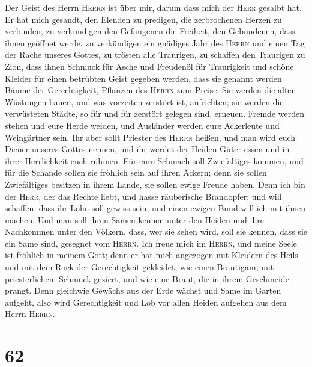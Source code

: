  Der Geist des Herrn \textsc{Herrn} ist über mir, darum
dass mich der \textsc{Herr} gesalbt hat. Er hat mich gesandt, den
Elenden zu predigen, die zerbrochenen Herzen zu verbinden, zu
verkündigen den Gefangenen die Freiheit, den Gebundenen, dass ihnen
geöffnet werde,  zu verkündigen ein gnädiges Jahr des
\textsc{Herrn} und einen Tag der Rache unseres Gottes, zu trösten alle
Traurigen,  zu schaffen den Traurigen zu Zion, dass ihnen
Schmuck für Asche und Freudenöl für Traurigkeit und schöne Kleider für
einen betrübten Geist gegeben werden, dass sie genannt werden Bäume der
Gerechtigkeit, Pflanzen des \textsc{Herrn} zum Preise. 
Sie werden die alten Wüstungen bauen, und was vorzeiten zerstört ist,
aufrichten; sie werden die verwüsteten Städte, so für und für zerstört
gelegen sind, erneuen.  Fremde werden stehen und eure
Herde weiden, und Ausländer werden eure Ackerleute und Weingärtner sein.
 Ihr aber sollt Priester des \textsc{Herrn} heißen, und
man wird euch Diener unseres Gottes nennen, und ihr werdet der Heiden
Güter essen und in ihrer Herrlichkeit euch rühmen.  Für
eure Schmach soll Zwiefältiges kommen, und für die Schande sollen sie
fröhlich sein auf ihren Äckern; denn sie sollen Zwiefältiges besitzen in
ihrem Lande, sie sollen ewige Freude haben.  Denn ich bin
der \textsc{Herr}, der das Rechte liebt, und hasse räuberische
Brandopfer; und will schaffen, dass ihr Lohn soll gewiss sein, und einen
ewigen Bund will ich mit ihnen machen.  Und man soll ihren
Samen kennen unter den Heiden und ihre Nachkommen unter den Völkern,
dass, wer sie sehen wird, soll sie kennen, dass sie ein Same sind,
gesegnet vom \textsc{Herrn}.  Ich freue mich im
\textsc{Herrn}, und meine Seele ist fröhlich in meinem Gott; denn er hat
mich angezogen mit Kleidern des Heils und mit dem Rock der Gerechtigkeit
gekleidet, wie einen Bräutigam, mit priesterlichem Schmuck geziert, und
wie eine Braut, die in ihrem Geschmeide prangt.  Denn
gleichwie Gewächs aus der Erde wächst und Same im Garten aufgeht, also
wird Gerechtigkeit und Lob vor allen Heiden aufgehen aus dem Herrn
\textsc{Herrn}.

\hypertarget{section-61}{%
\section{62}\label{section-61}}

